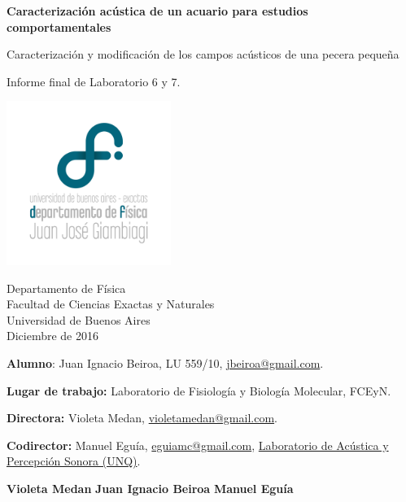 \begin{titlepage}
    \begin{center}
        \vspace*{1cm}
        
        \Large{\textbf{Caracterización acústica de un acuario para estudios comportamentales}}
        
        \vspace{0.5cm}
        \large{Caracterización y modificación de los campos acústicos de una pecera pequeña}
        
        \vfill
        
        Informe final de Laboratorio 6 y 7.
        
        \vspace{0.8cm}
        
        \includegraphics[width=0.4\textwidth]{figures/logodf}
        
        Departamento de Física\\
        Facultad de Ciencias Exactas y Naturales\\
        Universidad de Buenos Aires\\
        Diciembre de 2016
        
    \end{center}
\end{titlepage}
\newpage
\begin{titlepage}
	\begin{flushleft}
	    \vspace{1.5cm}
        
        \textbf{Alumno}: Juan Ignacio Beiroa, LU 559/10, \href{mailto:jbeiroa@gmail.com}{jbeiroa@gmail.com}.
        
        \vspace{1.5cm}
        
        \textbf{Lugar de trabajo:} Laboratorio de Fisiología y Biología Molecular, FCEyN.
        
        \vspace{2.5cm}
        
        \textbf{Directora:} Violeta Medan, \href{mailto:violetamedan@gmail.com}{violetamedan@gmail.com}.
        
        \textbf{Codirector:} Manuel Eguía, \href{mailto:eguiamc@gmail.com}{eguiamc@gmail.com}, \href{http://www.lapso.org/}{Laboratorio de Acústica y Percepción Sonora (UNQ)}.

	\end{flushleft}
	\vfill
	\begin{center}
		\textbf{Violeta Medan} \hfill \textbf{Juan Ignacio Beiroa} \hfill \textbf{Manuel Eguía}
	\end{center}
\end{titlepage}